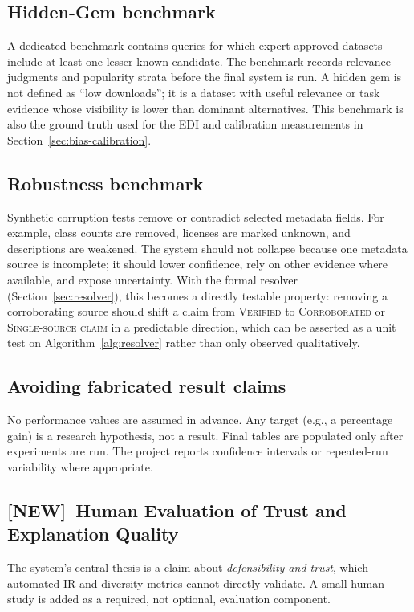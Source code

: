 \documentclass[11pt]{article}
\newcommand{\newtag}{\textcolor{accent}{\textbf{[NEW]}}\ }
\begin{document}
\subsection{Hidden-Gem benchmark}
\label{sec:hidden-gem}
A dedicated benchmark contains queries for which expert-approved datasets include at least one
lesser-known candidate. The benchmark records relevance judgments and popularity strata before the final
system is run. A hidden gem is not defined as ``low downloads''; it is a dataset with useful relevance or
task evidence whose visibility is lower than dominant alternatives. This benchmark is also the ground
truth used for the EDI and calibration measurements in Section~\ref{sec:bias-calibration}.

\subsection{Robustness benchmark}
Synthetic corruption tests remove or contradict selected metadata fields. For example, class counts are
removed, licenses are marked unknown, and descriptions are weakened. The system should not collapse
because one metadata source is incomplete; it should lower confidence, rely on other evidence where
available, and expose uncertainty. With the formal resolver (Section~\ref{sec:resolver}), this becomes a
directly testable property: removing a corroborating source should shift a claim from
\textsc{Verified} to \textsc{Corroborated} or \textsc{Single-source claim} in a predictable direction,
which can be asserted as a unit test on Algorithm~\ref{alg:resolver} rather than only observed
qualitatively.

\subsection{Avoiding fabricated result claims}
No performance values are assumed in advance. Any target (e.g., a percentage gain) is a research
hypothesis, not a result. Final tables are populated only after experiments are run. The project reports
confidence intervals or repeated-run variability where appropriate.

\subsection{\newtag Human Evaluation of Trust and Explanation Quality}
\label{sec:human-eval}
The system's central thesis is a claim about \emph{defensibility and trust}, which automated IR and
diversity metrics cannot directly validate. A small human study is added as a required, not optional,
evaluation component.
\end{document}
